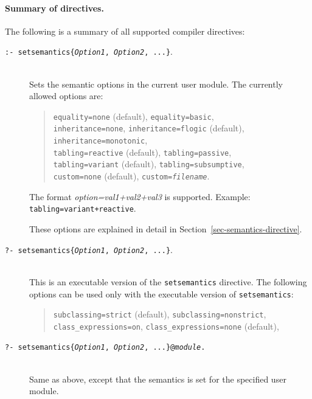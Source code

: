 \documentclass[11pt]{article}
\begin{document}
\paragraph{Summary of directives.}
The following is a summary of all supported compiler directives:
\begin{description}
  \item[{\tt :- setsemantics\{\emph{Option1}, \emph{Option2}, ...\}}.]
%
~~~\\
Sets the semantic options in the current user module.  The currently allowed
options are:
\begin{quote}
{\tt equality=none} (default), {\tt equality=basic},\\
{\tt inheritance=none}, {\tt inheritance=flogic} (default),
\texttt{inheritance=monotonic}, \\
{\tt tabling=reactive} (default), {\tt tabling=passive},\\
{\tt tabling=variant} (default), {\tt tabling=subsumptive},\\
{\tt custom=none} (default), {\tt custom=\emph{filename}}.
\end{quote}
The format \textit{option=val1+val2+val3} is supported. Example:
\texttt{tabling=variant+reactive}.

These options are explained in detail in Section~\ref{sec-semantics-directive}.
\item[{\tt ?- setsemantics\{\emph{Option1}, \emph{Option2}, ...\}}.]
  ~~~\\
  This is an executable version of the {\tt setsemantics} directive.
  The following options can be used only with the executable version of
  \texttt{setsemantics}:
  \begin{quote}
    {\tt subclassing=strict} (default), {\tt subclassing=nonstrict},\\
    {\tt class\_expressions=on}, {\tt class\_expressions=none} (default),\\
  \end{quote}
\item[{\tt ?- setsemantics\{\emph{Option1}, \emph{Option2}, ...\}@\emph{module}.}]
  ~~~\\
  Same as above, except that the semantics is set for the specified user module.
  

\end{description}
\end{document}
